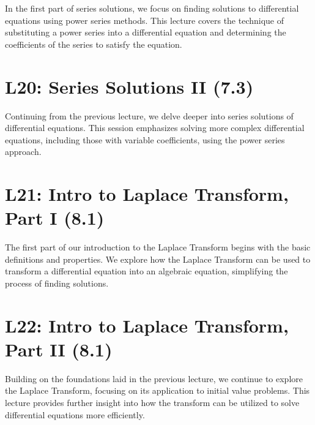 \documentclass[
  letterpaper,
  DIV=11,
  numbers=noendperiod]{scrreprt}
\theoremstyle{plain}
\theoremstyle{remark}
\begin{document}

In the first part of series solutions, we focus on finding solutions to
differential equations using power series methods. This lecture covers
the technique of substituting a power series into a differential
equation and determining the coefficients of the series to satisfy the
equation.

\section*{L20: Series Solutions II
(7.3)}\label{l20-series-solutions-ii-7.3}


Continuing from the previous lecture, we delve deeper into series
solutions of differential equations. This session emphasizes solving
more complex differential equations, including those with variable
coefficients, using the power series approach.

\section*{L21: Intro to Laplace Transform, Part I
(8.1)}\label{l21-intro-to-laplace-transform-part-i-8.1}


The first part of our introduction to the Laplace Transform begins with
the basic definitions and properties. We explore how the Laplace
Transform can be used to transform a differential equation into an
algebraic equation, simplifying the process of finding solutions.

\section*{L22: Intro to Laplace Transform, Part II
(8.1)}\label{l22-intro-to-laplace-transform-part-ii-8.1}


Building on the foundations laid in the previous lecture, we continue to
explore the Laplace Transform, focusing on its application to initial
value problems. This lecture provides further insight into how the
transform can be utilized to solve differential equations more
efficiently.
\end{document}
